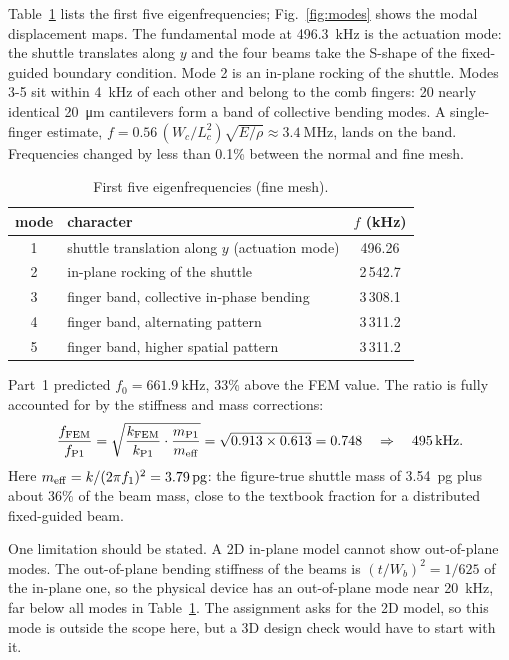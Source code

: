Table~\ref{tab:q2modes} lists the first five eigenfrequencies;
Fig.~\ref{fig:modes} shows the modal displacement maps. The fundamental mode
at \SI{496.3}{\kilo\hertz} is the actuation mode: the shuttle translates
along $y$ and the four beams take the S-shape of the fixed-guided boundary
condition. Mode 2 is an in-plane rocking of the shuttle. Modes 3-5 sit
within \SI{4}{\kilo\hertz} of each other and belong to the comb fingers: 20
nearly identical \SI{20}{\micro\meter} cantilevers form a band of
collective bending modes. A single-finger estimate,
$f=0.56\,(W_{c}/L_{c}^{2})\sqrt{E/\rho}\approx\SI{3.4}{\mega\hertz}$, lands
on the band. Frequencies changed by less than 0.1\% between the normal and
fine mesh.

\begin{table}[H]
\centering
\small
\caption{First five eigenfrequencies (fine mesh).}
\label{tab:q2modes}
\begin{tabular}{clc}
\toprule
mode & character & $f$ (\si{\kilo\hertz})\\
\midrule
1 & shuttle translation along $y$ (actuation mode) & 496.26\\
2 & in-plane rocking of the shuttle                & 2\,542.7\\
3 & finger band, collective in-phase bending        & 3\,308.1\\
4 & finger band, alternating pattern                & 3\,311.2\\
5 & finger band, higher spatial pattern             & 3\,311.2\\
\bottomrule
\end{tabular}
\end{table}

Part~1 predicted $f_{0}=\SI{661.9}{\kilo\hertz}$, 33\% above the FEM value.
The ratio is fully accounted for by the stiffness and mass corrections:
\begin{equation}
  \frac{f_{\mathrm{FEM}}}{f_{\mathrm{P1}}}
  = \sqrt{\frac{k_{\mathrm{FEM}}}{k_{\mathrm{P1}}}\cdot\frac{m_{\mathrm{P1}}}{m_{\mathrm{eff}}}}
  = \sqrt{0.913\times0.613} = 0.748
  \quad\Rightarrow\quad \SI{495}{\kilo\hertz}.
\end{equation}
Here $\meff = k/(2\pi f_{1})^{2} = \SI{3.79}{\pico\gram}$: the figure-true
shuttle mass of \SI{3.54}{\pico\gram} plus about 36\% of the beam mass, close
to the textbook fraction for a distributed fixed-guided beam.

One limitation should be stated. A 2D in-plane model cannot show
out-of-plane modes. The out-of-plane bending stiffness of the beams is
$(t/W_{b})^{2}=1/625$ of the in-plane one, so the physical device has an
out-of-plane mode near \SI{20}{\kilo\hertz}, far below all modes in
Table~\ref{tab:q2modes}. The assignment asks for the 2D model, so this mode
is outside the scope here, but a 3D design check would have to start with it.

